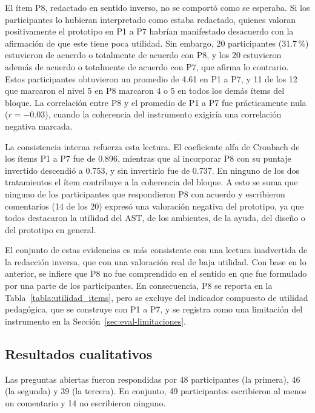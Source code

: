 El ítem P8, redactado en sentido inverso, no se comportó como se esperaba. Si los participantes lo hubieran interpretado como estaba redactado, quienes valoran positivamente el prototipo en P1 a P7 habrían manifestado desacuerdo con la afirmación de que este tiene poca utilidad. Sin embargo, 20 participantes (31.7\,\%) estuvieron de acuerdo o totalmente de acuerdo con P8, y los 20 estuvieron además de acuerdo o totalmente de acuerdo con P7, que afirma lo contrario. Estos participantes obtuvieron un promedio de 4.61 en P1 a P7, y 11 de los 12 que marcaron el nivel 5 en P8 marcaron 4 o 5 en todos los demás ítems del bloque. La correlación entre P8 y el promedio de P1 a P7 fue prácticamente nula ($r = -0.03$), cuando la coherencia del instrumento exigiría una correlación negativa marcada.

La consistencia interna refuerza esta lectura. El coeficiente alfa de Cronbach de los ítems P1 a P7 fue de 0.896, mientras que al incorporar P8 con su puntaje invertido descendió a 0.753, y sin invertirlo fue de 0.737. En ninguno de los dos tratamientos el ítem contribuye a la coherencia del bloque. A esto se suma que ninguno de los participantes que respondieron P8 con acuerdo y escribieron comentarios (14 de los 20) expresó una valoración negativa del prototipo, ya que todos destacaron la utilidad del AST, de los ambientes, de la ayuda, del diseño o del prototipo en general.

El conjunto de estas evidencias es más consistente con una lectura inadvertida de la redacción inversa, que con una valoración real de baja utilidad. Con base en lo anterior, se infiere que P8 no fue comprendido en el sentido en que fue formulado por una parte de los participantes. En consecuencia, P8 se reporta en la Tabla~\ref{tabla:utilidad_items}, pero se excluye del indicador compuesto de utilidad pedagógica, que se construye con P1 a P7, y se registra como una limitación del instrumento en la Sección~\ref{sec:eval-limitaciones}.

\subsection{Resultados cualitativos}

Las preguntas abiertas fueron respondidas por 48 participantes (la primera), 46 (la segunda) y 39 (la tercera). En conjunto, 49 participantes escribieron al menos un comentario y 14 no escribieron ninguno.

